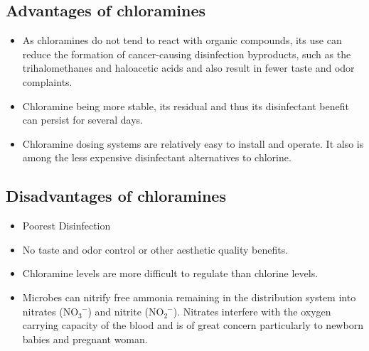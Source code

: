 \subsection{Advantages of chloramines}
\begin{itemize}
\item As chloramines do not tend to react with organic compounds, its use can reduce the formation of cancer-causing disinfection byproducts, such as the trihalomethanes and haloacetic acids and also result in fewer taste and odor complaints. 
\item Chloramine being more stable, its residual and thus its disinfectant benefit can persist for several days.
\item Chloramine dosing systems are relatively easy to install and operate. It also is among the less expensive disinfectant alternatives to chlorine.
\end{itemize}
\subsection{Disadvantages of chloramines}
\begin{itemize}
\item Poorest Disinfection
\item No taste and odor control or other aesthetic quality benefits.
\item Chloramine levels are more difficult to regulate than chlorine levels.  \item Microbes can nitrify  free ammonia remaining in the distribution system into nitrates (NO$_3^{\enspace-}$) and nitrite (NO$_2^{\enspace-}$). Nitrates interfere with the oxygen carrying capacity of the blood and is of great concern particularly to newborn babies and pregnant woman.
\end{itemize}			
